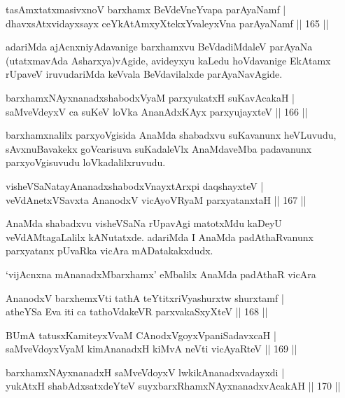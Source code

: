 \begin{shl}
tasAmxtatxmasivxnoV barxhamx BeVdeVneYvapa parAyaNamf |\\
dhavxsAtxvidayxsayx ceYkAtAmxyXtekxYvaleyxVna parAyaNamf \hfill || 165 ||
\end{shl}

\begin{artha}
adariMda ajAcnxniyAdavanige barxhamxvu BeVdadiMdaleV parAyaNa (utatxmavAda Asharxya)vAgide, avideyxyu kaLedu hoVdavanige EkAtamx rUpaveV iruvudariMda keVvala BeVdavilalxde parAyaNavAgide.
\end{artha}

\begin{shl}
barxhamxNAyxnanadxshabodxV\s yaM parxyukatxH suKavAcakaH |\\
saMveVdeyxV ca suKeV loVka AnanAdxKAyx parxyujayxteV \hfill || 166 ||
\end{shl}

\begin{artha}
barxhamxnalilx parxyoVgisida AnaMda shabadxvu suKavanunx heVLuvudu, sAvxnuBavakekx goVcarisuva suKadaleVlx AnaMdaveMba padavanunx parxyoVgisuvudu loVkadalilxruvudu.
\end{artha}

\begin{shl}
visheVSaNatayA\s \s nanadxshabodxV\s nayxtArxpi daqshayxteV |\\
veVdAnetxVSavxta AnanodxV vicAyoVR\s yaM parxyatanxtaH \hfill || 167 ||
\end{shl}

\begin{artha}
AnaMda shabadxvu visheVSaNa rUpavAgi matotxMdu kaDeyU veVdAMtagaLalilx kANutatxde. adariMda I AnaMda padAthaRvanunx parxyatanx pUvaRka vicAra mADatakakxdudx.
\end{artha}
\centerline{`vijAcnxna mAnanadxMbarxhamx' eMbalilx AnaMda padAthaR vicAra}

\begin{shl}
AnanodxV barxhemxVti tathA teYtitxriVyashurxtw shurxtamf |\\
atheYSa Eva iti ca tathoVdakeVR parxvakaSxyXteV \hfill || 168 ||
\end{shl}

\begin{shl}
BUmA tatusxKamiteyxVvaM CAnodxVgoyxVpaniSadavxcaH |\\
saMveVdoyxV\s yaM kimAnanadxH kiMvA neVti vicAyaRteV \hfill || 169 ||
\end{shl}

\begin{shl}
barxhamxNAyxnanadxH saMveVdoyxV lwkikAnanadxvadayxdi |\\
yukAtxH shabAdxsatxdeYteV suyxbarxRhamxNAyxnanadxvAcakAH \hfill || 170 ||
\end{shl}

